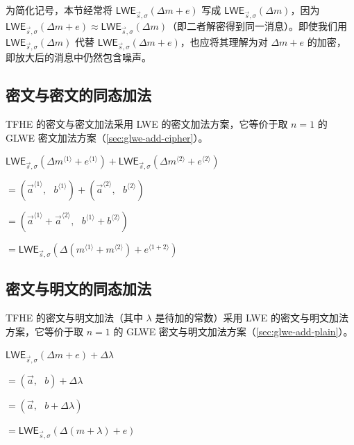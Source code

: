 为简化记号，本节经常将 $\textsf{LWE}_{\vec{s},\sigma}(\Delta  m + e)$ 写成 $\textsf{LWE}_{\vec{s},\sigma}(\Delta  m)$，因为 $\textsf{LWE}_{\vec{s},\sigma}(\Delta  m + e) \approx \textsf{LWE}_{\vec{s},\sigma}(\Delta  m)$（即二者解密得到同一消息）。即使我们用 $\textsf{LWE}_{\vec{s},\sigma}(\Delta  m)$ 代替 $\textsf{LWE}_{\vec{s},\sigma}(\Delta  m + e)$，也应将其理解为对 $\Delta m + e$ 的加密，即放大后的消息中仍然包含噪声。

\subsection{密文与密文的同态加法}
\label{subsec:tfhe-add-cipher}

TFHE 的密文与密文加法采用 LWE 的密文加法方案，它等价于取 $n = 1$ 的 GLWE 密文加法方案（\autoref{sec:glwe-add-cipher}）。


\begin{tcolorbox}[title={\textbf{\tboxlabel{\ref*{subsec:tfhe-add-cipher}} TFHE 密文与密文加法}}]
$\textsf{LWE}_{\vec{s}, \sigma}(\Delta m^{\langle 1 \rangle} + e^{\langle 1 \rangle} ) + \textsf{LWE}_{\vec{s}, \sigma}(\Delta m^{\langle 2 \rangle} + e^{\langle 2 \rangle}) $

$ = ( \vec{a}^{\langle 1 \rangle}, \text{ } b^{\langle 1 \rangle}) + (\vec{a}^{\langle 2 \rangle}, \text{ } b^{\langle 2 \rangle}) $

$ = ( \vec{a}^{\langle 1 \rangle} + \vec{a}^{\langle 2 \rangle}, \text{ } b^{\langle 1 \rangle} + b^{\langle 2 \rangle} ) $

$= \textsf{LWE}_{\vec{s}, \sigma}(\Delta(m^{\langle 1 \rangle} + m^{\langle 2 \rangle}) + e^{\langle 1 + 2 \rangle} )$
\label{Here}
\end{tcolorbox}


\subsection{密文与明文的同态加法}
\label{subsec:tfhe-add-plain}

TFHE 的密文与明文加法（其中 $\lambda$ 是待加的常数）采用 LWE 的密文与明文加法方案，它等价于取 $n = 1$ 的 GLWE 密文与明文加法方案（\autoref{sec:glwe-add-plain}）。

\begin{tcolorbox}[title={\textbf{\tboxlabel{\ref*{subsec:tfhe-add-plain}} TFHE 密文与明文加法}}]
$\textsf{LWE}_{\vec{s}, \sigma}(\Delta m + e) + \Delta \lambda $

$=  (\vec{a}, \text{ } b) + \Delta \lambda$

$=  (\vec{a}, \text{ } b + \Delta\lambda)$

$= \textsf{LWE}_{\vec{s}, \sigma}(\Delta (m + \lambda) + e )$
\end{tcolorbox}


